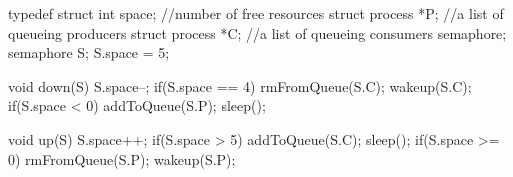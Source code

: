 \documentclass[varwidth=26em,crop]{standalone}
\begin{document}
\begin{ccode}
typedef struct{
  int space;         //number of free resources
  struct process *P; //a list of queueing producers
  struct process *C; //a list of queueing consumers
} semaphore;
semaphore S;
S.space = 5;        
\end{ccode}
\vspace{.5em}
  \begin{minipage}{.4\linewidth}
    \begin{ccode}
void down(S){
  S.space--;
  if(S.space == 4){
    rmFromQueue(S.C);
    wakeup(S.C);
  }
  if(S.space < 0){
    addToQueue(S.P);
    sleep();
  }
}
    \end{ccode}
  \end{minipage}\qquad
  \begin{minipage}{.4\linewidth}
    \begin{ccode}
void up(S){
  S.space++;
  if(S.space > 5){
    addToQueue(S.C);
    sleep();
  }
  if(S.space >= 0){
    rmFromQueue(S.P);
    wakeup(S.P);
  }
}
    \end{ccode}
  \end{minipage}
\end{document}
